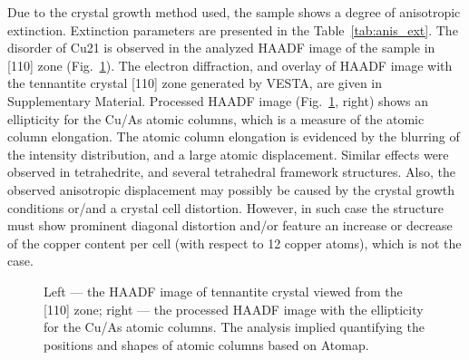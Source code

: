 \documentclass[preprint,review,12pt]{elsarticle}
\begin{document}
Due to the crystal growth method used, the sample shows a degree of anisotropic extinction. Extinction parameters are presented in the Table~\ref{tab:anis_ext}.
The disorder of Cu21 is observed in the analyzed HAADF image of the sample in [110] zone (Fig.~\ref{fig:micro}).
The electron diffraction, and overlay of HAADF image with the tennantite crystal [110] zone generated by VESTA\cite{Momma2011}, are given in Supplementary Material.
Processed HAADF image (Fig.~\ref{fig:micro}, right) shows  an ellipticity for the Cu/As atomic columns, which is a measure of the atomic column elongation\cite{Nord2017}.
The atomic column elongation is evidenced by the blurring of the intensity distribution, and a large atomic displacement.
Similar effects were observed in tetrahedrite\cite{Mishra2017}, and several tetrahedral framework structures\cite{Suekuni2019}.
Also, the observed anisotropic displacement may possibly be caused by the crystal growth conditions or/and a crystal cell distortion.
However, in such case the structure must show prominent diagonal distortion and/or feature an increase or decrease of the copper content per cell (with respect to 12 copper atoms), which is not the case.

\begin{figure}[ht]
\centering
{}
 \quad
{}
\caption{\label{fig:micro} Left --- the HAADF image of tennantite crystal viewed from the [110] zone; right --- the processed HAADF image with the ellipticity for the Cu/As atomic columns. The analysis implied quantifying the positions and shapes of atomic columns based on Atomap\cite{Nord2017}. }
\end{figure}
\end{document}

